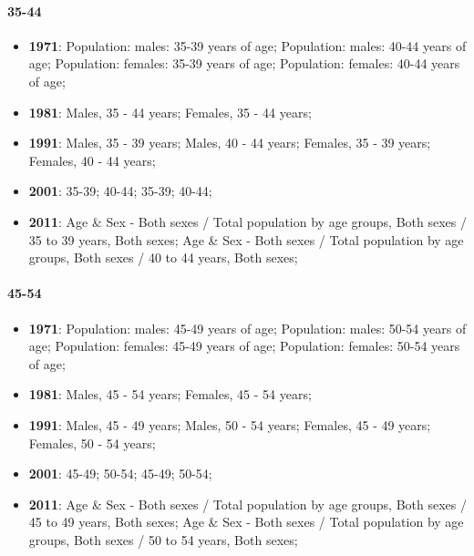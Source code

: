 \documentclass[a4paper]{article}
\begin{document}
\paragraph{35-44}
\begin{itemize}
   \item{\textbf{1971}:  Population: males: 35-39 years of age; Population: males: 40-44 years of age; Population: females: 35-39 years of age; Population: females: 40-44 years of age;}
   \item{\textbf{1981}:  Males, 35 - 44 years; Females, 35 - 44 years;}
   \item{\textbf{1991}:  Males, 35 - 39 years; Males, 40 - 44 years; Females, 35 - 39 years; Females, 40 - 44 years;}
   \item{\textbf{2001}:  35-39; 40-44; 35-39; 40-44;}
   \item{\textbf{2011}:  Age \& Sex - Both sexes / Total population by age groups, Both sexes / 35 to 39 years, Both sexes; Age \& Sex - Both sexes / Total population by age groups, Both sexes / 40 to 44 years, Both sexes;}
\end{itemize}

\paragraph{45-54}
\begin{itemize}
   \item{\textbf{1971}:  Population: males: 45-49 years of age; Population: males: 50-54 years of age; Population: females: 45-49 years of age; Population: females: 50-54 years of age;}
   \item{\textbf{1981}:  Males, 45 - 54 years; Females, 45 - 54 years;}
   \item{\textbf{1991}:  Males, 45 - 49 years; Males, 50 - 54 years; Females, 45 - 49 years; Females, 50 - 54 years;}
   \item{\textbf{2001}:  45-49; 50-54; 45-49; 50-54;}
   \item{\textbf{2011}:  Age \& Sex - Both sexes / Total population by age groups, Both sexes / 45 to 49 years, Both sexes; Age \& Sex - Both sexes / Total population by age groups, Both sexes / 50 to 54 years, Both sexes;}
\end{itemize}
\end{document}
